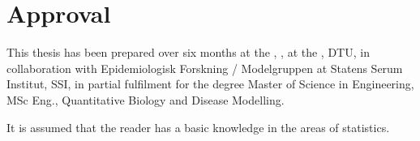 \section*{Approval}
This thesis has been prepared over six months at the \sectiondescriber, \departmentdescriber, at the \universitydescriber, DTU, in collaboration with Epidemiologisk Forskning / Modelgruppen at Statens Serum Institut, SSI, in partial fulfilment for the degree Master of Science in Engineering, MSc Eng., Quantitative Biology and Disease Modelling. 

It is assumed that the reader has a basic knowledge in the areas of statistics. 

\vfill

\begin{center}
\namesigdate{\thesisauthor~-~\studentnumber}
\end{center}

\vfill

